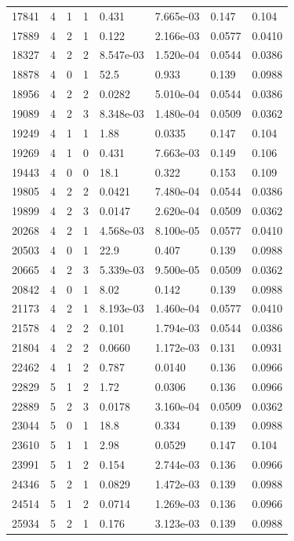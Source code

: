\documentclass[preview]{standalone}
\begin{document}
{{{\begin{tabular}{L{1.2cm}C{1.2cm} C{0.3cm}C{0.5cm} C{1.4cm}C{1.4cm} C{1.4cm}C{1.4cm}}
  17841  &     4  & 1     &  1 &  0.431  & 7.665e-03  & 0.147 &  0.104   \\ 
  17889  &     4  & 2     &  1 &  0.122  & 2.166e-03  & 0.0577 &  0.0410   \\ 
  18327  &     4  & 2     &  2 &  8.547e-03  & 1.520e-04  & 0.0544 &  0.0386   \\ 
  18878  &     4  & 0     &  1 &  52.5  & 0.933  & 0.139 &  0.0988   \\ 
  18956  &     4  & 2     &  2 &  0.0282  & 5.010e-04  & 0.0544 &  0.0386   \\ 
  19089  &     4  & 2     &  3 &  8.348e-03  & 1.480e-04  & 0.0509 &  0.0362   \\ 
  19249  &     4  & 1     &  1 &  1.88  & 0.0335  & 0.147 &  0.104   \\ 
  19269  &     4  & 1     &  0 &  0.431  & 7.663e-03  & 0.149 &  0.106   \\ 
  19443  &     4  & 0     &  0 &  18.1  & 0.322  & 0.153 &  0.109   \\ 
  19805  &     4  & 2     &  2 &  0.0421  & 7.480e-04  & 0.0544 &  0.0386   \\ 
  19899  &     4  & 2     &  3 &  0.0147  & 2.620e-04  & 0.0509 &  0.0362   \\ 
  20268  &     4  & 2     &  1 &  4.568e-03  & 8.100e-05  & 0.0577 &  0.0410   \\ 
  20503  &     4  & 0     &  1 &  22.9  & 0.407  & 0.139 &  0.0988   \\ 
  20665  &     4  & 2     &  3 &  5.339e-03  & 9.500e-05  & 0.0509 &  0.0362   \\ 
  20842  &     4  & 0     &  1 &  8.02  & 0.142  & 0.139 &  0.0988   \\ 
  21173  &     4  & 2     &  1 &  8.193e-03  & 1.460e-04  & 0.0577 &  0.0410   \\ 
  21578  &     4  & 2     &  2 &  0.101  & 1.794e-03  & 0.0544 &  0.0386   \\ 
  21804  &     4  & 2     &  2 &  0.0660  & 1.172e-03  & 0.131 &  0.0931   \\ 
  22462  &     4  & 1     &  2 &  0.787  & 0.0140  & 0.136 &  0.0966   \\ 
  22829  &     5  & 1     &  2 &  1.72  & 0.0306  & 0.136 &  0.0966   \\ 
  22889  &     5  & 2     &  3 &  0.0178  & 3.160e-04  & 0.0509 &  0.0362   \\ 
  23044  &     5  & 0     &  1 &  18.8  & 0.334  & 0.139 &  0.0988   \\ 
  23610  &     5  & 1     &  1 &  2.98  & 0.0529  & 0.147 &  0.104   \\ 
  23991  &     5  & 1     &  2 &  0.154  & 2.744e-03  & 0.136 &  0.0966   \\ 
  24346  &     5  & 2     &  1 &  0.0829  & 1.472e-03  & 0.139 &  0.0988   \\ 
  24514  &     5  & 1     &  2 &  0.0714  & 1.269e-03  & 0.136 &  0.0966   \\ 
  25934  &     5  & 2     &  1 &  0.176  & 3.123e-03  & 0.139 &  0.0988   \\ 
\hline 
\end{tabular} 

}}}
\end{document}
